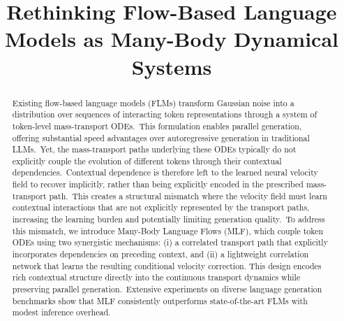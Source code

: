 \documentclass{article} %
\title{Rethinking Flow-Based Language Models as Many-Body Dynamical Systems}
\author{
}
\begin{document}
\maketitle

\begin{abstract}

Existing flow-based language models (FLMs) transform Gaussian noise into a distribution over sequences of interacting token representations through a system of token-level mass-transport ODEs.~This formulation enables parallel generation, offering substantial speed advantages over autoregressive generation in traditional LLMs.~Yet, the mass-transport paths underlying these ODEs typically do not explicitly couple the evolution of different tokens through their contextual dependencies.~Contextual dependence is therefore left to the learned neural velocity field to recover implicitly, rather than being explicitly encoded in the prescribed mass-transport path.~This creates a structural mismatch where the velocity field must learn contextual interactions that are not explicitly represented by the transport paths, increasing the learning burden and potentially limiting generation quality.~To address this mismatch, we introduce Many-Body Language Flows (MLF), which couple token ODEs using two synergistic mechanisms: (i) a correlated transport path that explicitly incorporates dependencies on preceding context, and (ii) a lightweight correlation network that learns the resulting conditional velocity correction. This design encodes rich contextual structure directly into the continuous transport dynamics while preserving parallel generation.~Extensive experiments on diverse language generation benchmarks show that MLF consistently outperforms state-of-the-art FLMs with modest inference overhead.


\end{abstract}
\end{document}
